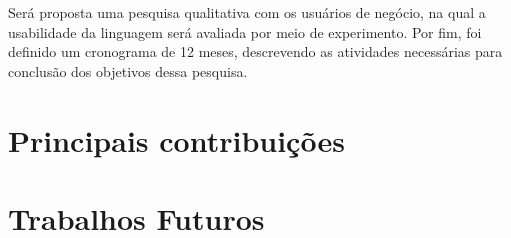 Será proposta uma pesquisa qualitativa com os usuários de negócio, na qual a usabilidade da linguagem será avaliada por meio de experimento. Por fim, foi definido um cronograma de 12 meses, descrevendo as atividades necessárias para conclusão dos objetivos dessa pesquisa.

\section{Principais contribuições}
\label{principaiscontribuicoes}

\section{Trabalhos Futuros}
\label{trabalhosfuturos}